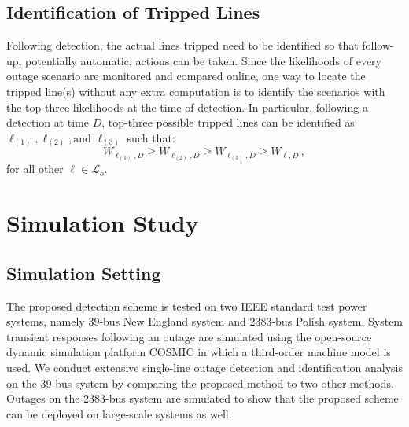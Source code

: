 \subsection{Identification of Tripped Lines}
Following detection, the actual lines tripped need to be identified so that follow-up, potentially automatic, actions can be taken. 
Since the likelihoods of every outage scenario are monitored and compared online, one way to locate the tripped line(s) without any extra computation is to identify the scenarios with the top three likelihoods at the time of detection. In particular, following a detection at time $D$, top-three possible tripped lines can be identified as $\ell_{(1)}, \ell_{(2)}, \text{and } \ell_{(3)}$ such that:
\begin{equation}
\label{ch3:eqn:identification}
{W}_{\ell_{(1)}, D} \ge {W}_{\ell_{(2)}, D} \ge {W}_{\ell_{(3)}, D} \ge {W}_{\ell, D}\,,
\end{equation} for all other $\ell \in \mathcal{L}_o$.




\section{Simulation Study}
\label{ch3:sec:results}
\subsection{Simulation Setting}
The proposed detection scheme is tested on two IEEE standard test power systems, namely 39-bus New England system \cite{athay1979practical} and 2383-bus Polish system.  System transient responses following an outage are simulated using the open-source dynamic simulation platform COSMIC \cite{Song2016} in which a third-order machine model is used. We conduct extensive single-line outage detection and identification analysis on the 39-bus system by comparing the proposed method to two other methods. Outages on the 2383-bus system are simulated to show that the proposed scheme can be deployed on large-scale systems as well.

